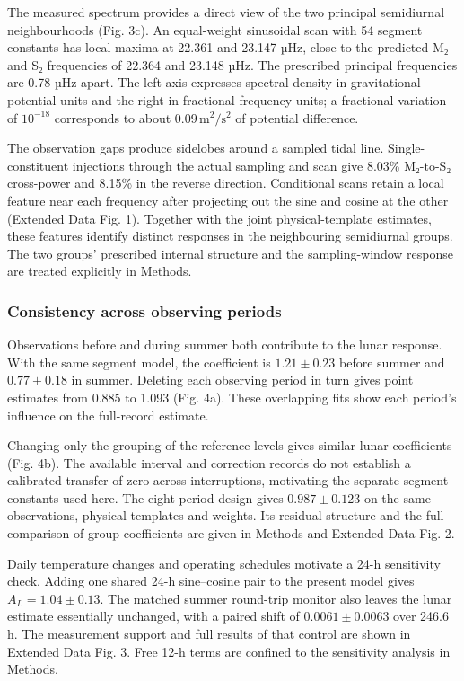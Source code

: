 \documentclass[
  12pt,
  a4paper,
]{article}
\begin{document}
The measured spectrum provides a direct view of the two principal
semidiurnal neighbourhoods (Fig. 3c). An equal-weight sinusoidal scan
with 54 segment constants has local maxima at 22.361 and 23.147 µHz,
close to the predicted M₂ and S₂ frequencies of 22.364 and 23.148 µHz.
The prescribed principal frequencies are 0.78 µHz apart. The left axis
expresses spectral density in gravitational-potential units and the
right in fractional-frequency units; a fractional variation of
\(10^{-18}\) corresponds to about \(0.09\,\mathrm{m^2/s^2}\) of
potential difference.

The observation gaps produce sidelobes around a sampled tidal line.
Single-constituent injections through the actual sampling and scan give
8.03\% M₂-to-S₂ cross-power and 8.15\% in the reverse direction.
Conditional scans retain a local feature near each frequency after
projecting out the sine and cosine at the other (Extended Data Fig. 1).
Together with the joint physical-template estimates, these features
identify distinct responses in the neighbouring semidiurnal groups. The
two groups' prescribed internal structure and the sampling-window
response are treated explicitly in Methods.

\hypertarget{consistency-across-observing-periods}{%
\subsubsection{Consistency across observing
periods}\label{consistency-across-observing-periods}}

Observations before and during summer both contribute to the lunar
response. With the same segment model, the coefficient is
\(1.21\pm0.23\) before summer and \(0.77\pm0.18\) in summer. Deleting
each observing period in turn gives point estimates from 0.885 to 1.093
(Fig. 4a). These overlapping fits show each period's influence on the
full-record estimate.

Changing only the grouping of the reference levels gives similar lunar
coefficients (Fig. 4b). The available interval and correction records do
not establish a calibrated transfer of zero across interruptions,
motivating the separate segment constants used here. The eight-period
design gives \(0.987\pm0.123\) on the same observations, physical
templates and weights. Its residual structure and the full comparison of
group coefficients are given in Methods and Extended Data Fig. 2.

Daily temperature changes and operating schedules motivate a 24-h
sensitivity check. Adding one shared 24-h sine--cosine pair to the
present model gives \(A_L=1.04\pm0.13\). The matched summer round-trip
monitor also leaves the lunar estimate essentially unchanged, with a
paired shift of \(0.0061\pm0.0063\) over 246.6 h. The measurement
support and full results of that control are shown in Extended Data Fig.
3. Free 12-h terms are confined to the sensitivity analysis in Methods.
\end{document}
